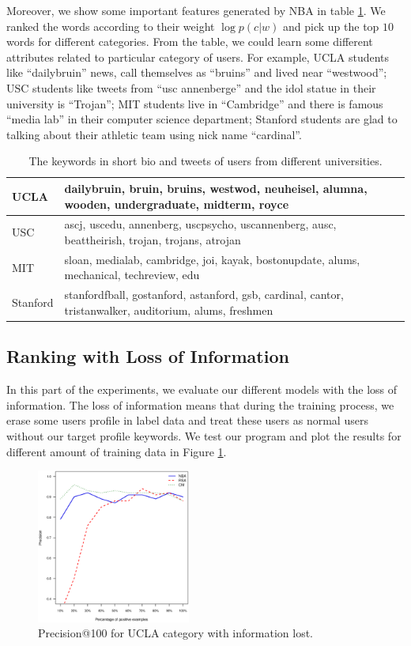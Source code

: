 \documentclass{article}
\begin{document}
Moreover, we show some important features generated by NBA in table \ref{tab:keyword}. We ranked the words according to their weight $\log p(c|w)$ and pick up the top $10$ words for different categories. From the table, we could learn some different attributes related to particular category of users. For example, UCLA students like ``dailybruin'' news, call themselves as ``bruins'' and lived near ``westwood''; USC students like tweets from ``usc annenberge'' and the idol statue in their university is ``Trojan''; MIT students live in ``Cambridge'' and there is famous ``media lab'' in their computer science department; Stanford students are glad to talking about their athletic team using nick name ``cardinal''.

\begin{table}[htb!]
\centering
\begin{tabular}{|l|l|}
\hline
UCLA & dailybruin, bruin, bruins, westwod, neuheisel, alumna, wooden, undergraduate, midterm, royce \\
\hline
USC & ascj, uscedu, annenberg, uscpsycho, uscannenberg, ausc, beattheirish, trojan, trojans, atrojan \\
\hline
MIT & sloan, medialab, cambridge, joi, kayak, bostonupdate, alums, mechanical, techreview, edu \\
\hline
Stanford & stanfordfball, gostanford, astanford, gsb, cardinal, cantor, tristanwalker, auditorium, alums, freshmen \\
\hline
\end{tabular}
\caption{The keywords in short bio and tweets of users from different universities.}\label{tab:keyword}
\end{table}

\subsection{Ranking with Loss of Information}
In this part of the experiments, we evaluate our different models with the loss of information. The loss of information means that during the training process, we erase some users profile in label data and treat these users as normal users without our target profile keywords. We test our program and plot the results for different amount of training data in Figure \ref{fig:e3}.

\begin{figure}[h]
\centering
\includegraphics[width=0.45\textwidth]{experiment/e2.ucla.eps}
\caption{Precision@100 for UCLA category with information lost.}
\label{fig:e3}
\end{figure}
\end{document}
